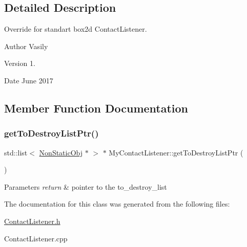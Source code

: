\subsection{Detailed Description}
Override for standart box2d Contact\+Listener. 

\begin{DoxyAuthor}{Author}
Vasily 
\end{DoxyAuthor}
\begin{DoxyVersion}{Version}
1. 
\end{DoxyVersion}
\begin{DoxyDate}{Date}
June 2017 
\end{DoxyDate}


\subsection{Member Function Documentation}
\mbox{\label{class_my_contact_listener_a3e414c674f98a2f35e2c894923d045b2}} 
\subsubsection{\texorpdfstring{get\+To\+Destroy\+List\+Ptr()}{getToDestroyListPtr()}}
{\footnotesize\ttfamily std\+::list$<$ \hyperlink{class_non_static_obj}{Non\+Static\+Obj} $\ast$ $>$ $\ast$ My\+Contact\+Listener\+::get\+To\+Destroy\+List\+Ptr (\begin{DoxyParamCaption}{ }\end{DoxyParamCaption})}


\begin{DoxyParams}{Parameters}
{\em return} & pointer to the \textquotesingle{}to\+\_\+destroy\+\_\+list\textquotesingle{} \\
\hline
\end{DoxyParams}


The documentation for this class was generated from the following files\+:\begin{DoxyCompactItemize}
\item 
\hyperlink{_contact_listener_8h}{Contact\+Listener.\+h}\item 
Contact\+Listener.\+cpp\end{DoxyCompactItemize}
